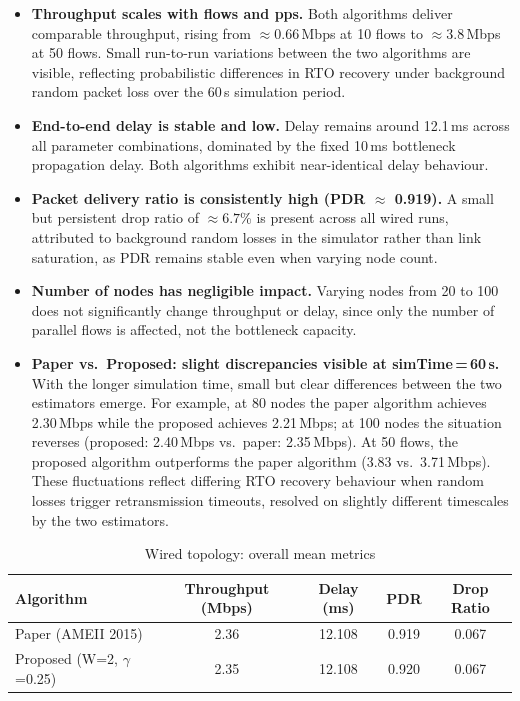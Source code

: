 \documentclass[12pt,a4paper]{report}
\begin{document}
\begin{itemize}
  \item \textbf{Throughput scales with flows and pps.}
        Both algorithms deliver comparable throughput, rising from
        $\approx0.66$\,Mbps at 10 flows to $\approx3.8$\,Mbps at 50 flows.
        Small run-to-run variations between the two algorithms are visible,
        reflecting probabilistic differences in RTO recovery under background
        random packet loss over the 60\,s simulation period.
  \item \textbf{End-to-end delay is stable and low.}
        Delay remains around 12.1\,ms across all parameter combinations,
        dominated by the fixed 10\,ms bottleneck propagation delay.
        Both algorithms exhibit near-identical delay behaviour.
  \item \textbf{Packet delivery ratio is consistently high (PDR $\approx$ 0.919).}
        A small but persistent drop ratio of $\approx6.7$\% is present across
        all wired runs, attributed to background random losses in the
        simulator rather than link saturation, as PDR remains stable
        even when varying node count.
  \item \textbf{Number of nodes has negligible impact.}
        Varying nodes from 20 to 100 does not significantly change throughput
        or delay, since only the number of parallel flows is affected, not
        the bottleneck capacity.
  \item \textbf{Paper vs.\ Proposed: slight discrepancies visible at simTime\,=\,60\,s.}
        With the longer simulation time, small but clear differences between
        the two estimators emerge.  For example, at 80 nodes the paper
        algorithm achieves 2.30\,Mbps while the proposed achieves 2.21\,Mbps;
        at 100 nodes the situation reverses (proposed: 2.40\,Mbps vs.\
        paper: 2.35\,Mbps).  At 50 flows, the proposed algorithm outperforms
        the paper algorithm (3.83 vs.\ 3.71\,Mbps).  These fluctuations
        reflect differing RTO recovery behaviour when random losses trigger
        retransmission timeouts, resolved on slightly different timescales
        by the two estimators.
\end{itemize}

\begin{table}[H]
  \centering
  \caption{Wired topology: overall mean metrics}
  \label{tab:wired-mean}
  \begin{tabular}{lcccc}
    \toprule
    \textbf{Algorithm} & \textbf{Throughput (Mbps)} & \textbf{Delay (ms)}
                       & \textbf{PDR} & \textbf{Drop Ratio} \\
    \midrule
    Paper (AMEII 2015) & 2.36 & 12.108 & 0.919 & 0.067 \\
    Proposed (W=2, $\gamma$=0.25) & 2.35 & 12.108 & 0.920 & 0.067 \\
    \bottomrule
  \end{tabular}
\end{table}
\end{document}
